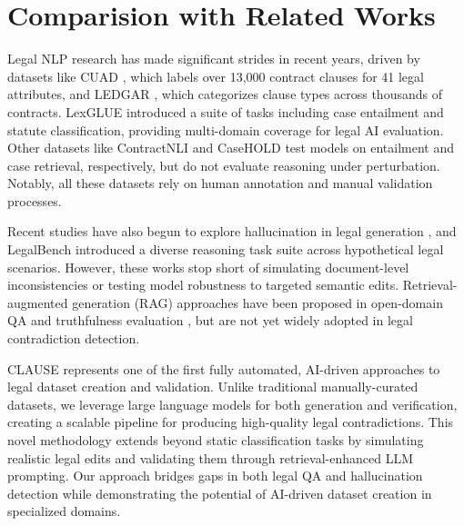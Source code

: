 \documentclass[11pt]{article}
\newcommand{\datasetName}{{\sc CLAUSE}\xspace}
\begin{document}
\section{Comparision with Related Works}
Legal NLP research has made significant strides in recent years, driven by datasets like CUAD \cite{hendrycks2021cuad}, which labels over 13,000 contract clauses for 41 legal attributes, and LEDGAR \cite{tuggener2020ledgar}, which categorizes clause types across thousands of contracts. LexGLUE \cite{chalkidis2022lexglue} introduced a suite of tasks including case entailment and statute classification, providing multi-domain coverage for legal AI evaluation. Other datasets like ContractNLI \cite{koreeda2021contractnli} and CaseHOLD \cite{zhong2020jec} test models on entailment and case retrieval, respectively, but do not evaluate reasoning under perturbation. Notably, all these datasets rely on human annotation and manual validation processes.

Recent studies have also begun to explore hallucination in legal generation \cite{shen2023hallucination}, and LegalBench \cite{zheng2023legalbench} introduced a diverse reasoning task suite across hypothetical legal scenarios. However, these works stop short of simulating document-level inconsistencies or testing model robustness to targeted semantic edits. Retrieval-augmented generation (RAG) approaches have been proposed in open-domain QA and truthfulness evaluation \cite{lin2022truthfulqa, ji2023haluEval}, but are not yet widely adopted in legal contradiction detection.

\datasetName represents one of the first fully automated, AI-driven approaches to legal dataset creation and validation. Unlike traditional manually-curated datasets, we leverage large language models for both generation and verification, creating a scalable pipeline for producing high-quality legal contradictions. This novel methodology extends beyond static classification tasks by simulating realistic legal edits and validating them through retrieval-enhanced LLM prompting. Our approach bridges gaps in both legal QA and hallucination detection while demonstrating the potential of AI-driven dataset creation in specialized domains.
\end{document}
